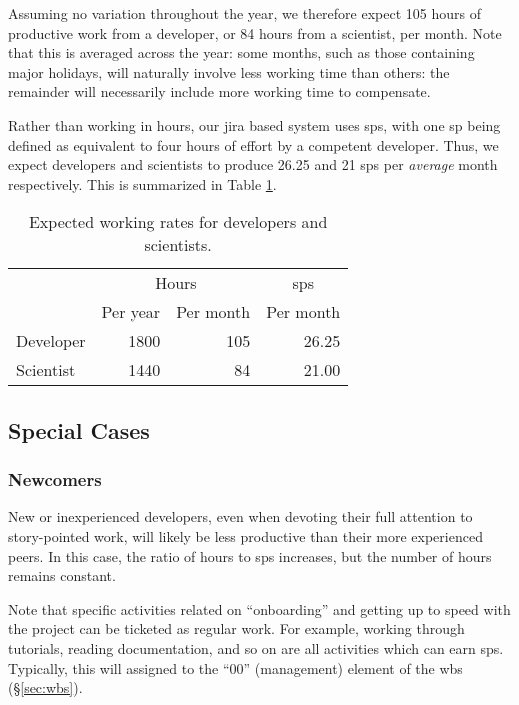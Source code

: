 Assuming no variation throughout the year, we therefore expect 105 hours of productive work from a developer, or 84 hours from a scientist, per month.
Note that this is averaged across the year: some months, such as those containing major holidays, will naturally involve less working time than others: the remainder will necessarily include more working time to compensate.

Rather than working in hours, our \gls{jira} based system uses \glspl{sp}, with one \gls{sp} being defined as equivalent to four hours of effort by a competent developer.
Thus, we expect developers and scientists to produce 26.25 and 21 \glspl{sp} per \emph{average} month respectively.
This is summarized in Table \ref{tab:working-rate}.

\begin{table}
\begin{longtable}[]{@{}lrrr@{}}
\hline
          & \multicolumn{2}{c}{Hours} & \multicolumn{1}{c}{\glspl{sp}} \\
          & Per year & Per month      & Per month \\
\hline
Developer & 1800     & 105            & 26.25 \\
Scientist & 1440     &  84            & 21.00 \\
\hline
\end{longtable}
\caption{Expected working rates for developers and scientists.}
\label{tab:working-rate}
\end{table}

\subsection{Special Cases}

\subsubsection{Newcomers}
\label{sec:newcomers}

New or inexperienced developers, even when devoting their full attention to story-pointed work, will likely be less productive than their more experienced peers.
In this case, the ratio of hours to \glspl{sp} increases, but the number of hours remains constant.

Note that specific activities related on ``onboarding'' and getting up to speed with the project can be ticketed as regular work.
For example, working through tutorials, reading documentation, and so on are all activities which can earn \glspl{sp}.
Typically, this will assigned to the ``00'' (management) element of the \gls{wbs} (\S\ref{sec:wbs}).

